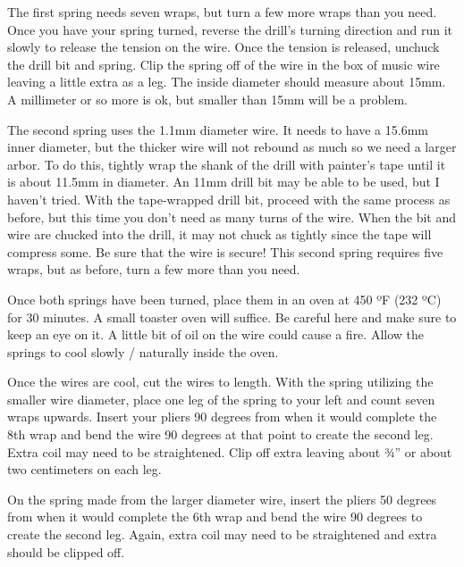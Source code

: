 \documentclass[openany]{book}
\begin{document}
The first spring needs seven wraps, but turn a few more wraps than you need. Once you have your spring turned, reverse the drill’s turning direction and run it slowly to release the tension on the wire. Once the tension is released, unchuck the drill bit and spring. Clip the spring off of the wire in the box of music wire leaving a little extra as a leg. The inside diameter should measure about 15mm. A millimeter or so more is ok, but smaller than 15mm will be a problem.

The second spring uses the 1.1mm diameter wire. It needs to have a 15.6mm inner diameter, but the thicker wire will not rebound as much so we need a larger arbor. To do this, tightly wrap the shank of the drill with painter’s tape until it is about 11.5mm in diameter. An 11mm drill bit may be able to be used, but I haven’t tried. With the tape-wrapped drill bit, proceed with the same process as before, but this time you don’t need as many turns of the wire. When the bit and wire are chucked into the drill, it may not chuck as tightly since the tape will compress some. Be sure that the wire is secure! This second spring requires five wraps, but as before, turn a few more than you need.

Once both springs have been turned, place them in an oven at 450 ºF (232 ºC) for 30 minutes. A small toaster oven will suffice. Be careful here and make sure to keep an eye on it. A little bit of oil on the wire could cause a fire. Allow the springs to cool slowly / naturally inside the oven. 

Once the wires are cool, cut the wires to length. With the spring utilizing the smaller wire diameter, place one leg of the spring to your left and count seven wraps upwards. Insert your pliers 90 degrees from when it would complete the 8th wrap and bend the wire 90 degrees at that point to create the second leg. Extra coil may need to be straightened. Clip off extra leaving about ¾” or about two centimeters on each leg.

On the spring made from the larger diameter wire, insert the pliers 50 degrees from when it would complete the 6th wrap and bend the wire 90 degrees to create the second leg. Again, extra coil may need to be straightened and extra should be clipped off.
\end{document}
